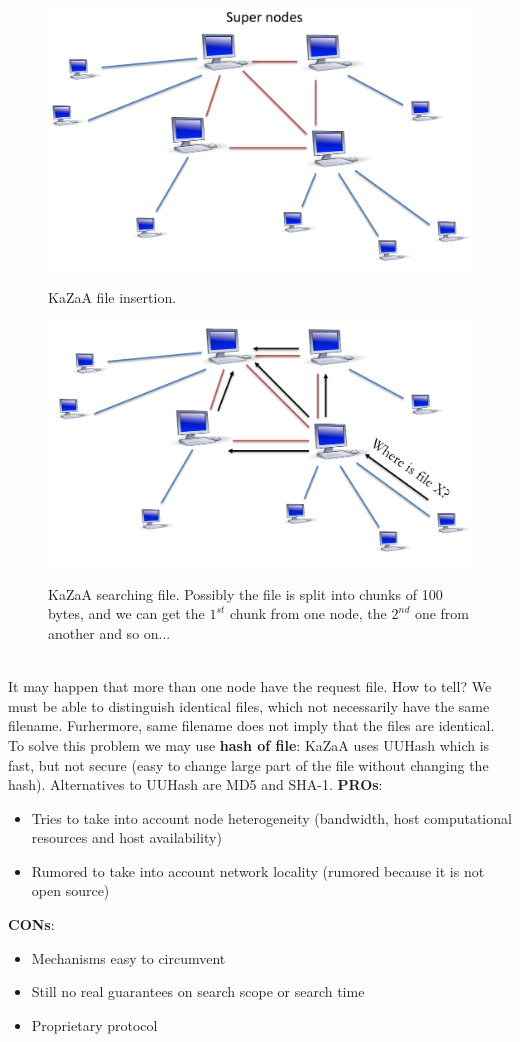 \documentclass[10pt,a4paper]{article}
\begin{document}
\begin{figure}[h!]
\centering
\begin{minipage}{.5\textwidth}
  \centering
  \includegraphics[width=.5\linewidth]{images/kazaa1.png}
  \label{fig:kazaa1}
  \caption{KaZaA file insertion.}
\end{minipage}%
\begin{minipage}{.5\textwidth}
  \centering
  \includegraphics[width=.5\linewidth]{images/kazaa2.png}
  \label{fig:kazaa2}
  \caption{KaZaA searching file. Possibly the file is split into chunks of 100 bytes, and we can get the $1^{st}$ chunk from one node, the $2^{nd}$ one from another and so on...}
\end{minipage}
\end{figure} \\
It may happen that more than one node have the request file. How to tell? We must be able to distinguish identical files, which not necessarily have the same filename. Furhermore, same filename does not imply that the files are identical. To solve this problem we may use \textbf{hash of file}: KaZaA uses UUHash which is fast, but not secure (easy to change large part of the file without changing the hash). Alternatives to UUHash are MD5 and SHA-1.
\textbf{PROs}:
\begin{itemize}
	\item Tries to take into account node heterogeneity (bandwidth, host computational resources and host availability)
	\item Rumored to take into account network locality (rumored because it is not open source)
\end{itemize}
\textbf{CONs}:
\begin{itemize}
	\item Mechanisms easy to circumvent
	\item Still no real guarantees on search scope or search time
	\item Proprietary protocol
\end{itemize}
\end{document}
